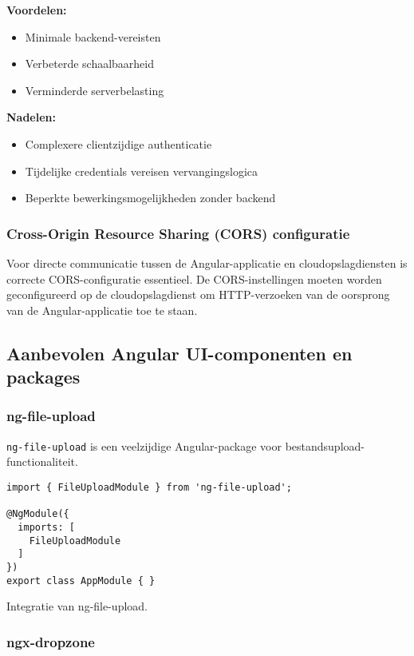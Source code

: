 \textbf{Voordelen:}
\begin{itemize}
    \item Minimale backend-vereisten
    \item Verbeterde schaalbaarheid
    \item Verminderde serverbelasting
\end{itemize}

\textbf{Nadelen:}
\begin{itemize}
    \item Complexere clientzijdige authenticatie
    \item Tijdelijke credentials vereisen vervangingslogica
    \item Beperkte bewerkingsmogelijkheden zonder backend
\end{itemize}

\subsubsection{Cross-Origin Resource Sharing (CORS) configuratie}

Voor directe communicatie tussen de Angular-applicatie en cloudopslagdiensten is correcte CORS-configuratie essentieel. De CORS-instellingen moeten worden geconfigureerd op de cloudopslagdienst om HTTP-verzoeken van de oorsprong van de Angular-applicatie toe te staan.

\subsection{Aanbevolen Angular UI-componenten en packages}

\subsubsection{ng-file-upload}

\texttt{ng-file-upload} is een veelzijdige Angular-package voor bestandsupload-functionaliteit.

\begin{listing}[H]
\begin{verbatim}
import { FileUploadModule } from 'ng-file-upload';

@NgModule({
  imports: [
    FileUploadModule
  ]
})
export class AppModule { }
\end{verbatim}
\caption[Integratie van ng-file-upload]{Integratie van ng-file-upload.}
\end{listing}

\subsubsection{ngx-dropzone}

